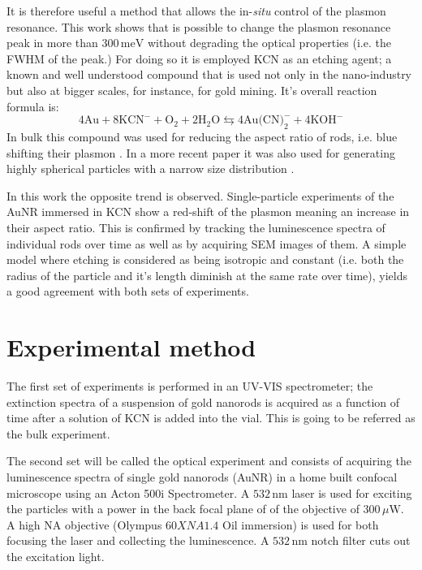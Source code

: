 \documentclass[twocolumn]{article}
\begin{document}
It is therefore useful a method that allows the in-\textit{situ} control of the
plasmon resonance. This work shows that is possible to change the plasmon
resonance peak in more than $300\,\textrm{meV}$ without degrading the optical
properties (i.e. the FWHM of the peak.) For doing so it is employed KCN as an
etching agent; a known and well understood compound that is used not only in the
nano-industry but also at bigger scales, for instance, for gold mining. It's
overall reaction formula is:
\begin{equation*}
4\textrm{Au} + 8\textrm{KCN}^-+\textrm{O}_2 + 2\textrm{H}_2\textrm{O}
\leftrightarrows 4\textrm{Au(CN)}_2^-+4\textrm{KOH}^-
\end{equation*}
In bulk this compound was used for reducing the aspect ratio of rods, i.e.
blue shifting their plasmon \cite{Jana2002}. In a more recent paper it was also
used for generating highly spherical particles with a narrow size
distribution \cite{Lee2013}.

In this work the opposite trend is observed. Single-particle experiments of the
AuNR immersed in KCN show a red-shift of the plasmon meaning an increase in
their aspect ratio. This is confirmed by tracking the luminescence spectra of
individual rods over time as well as by acquiring SEM images of them. A simple
model where etching is considered as being isotropic and constant (i.e. both the
radius of the particle and it's length diminish at the same rate over time),
yields a good agreement with both sets of experiments.

\section{Experimental method}
The first set of experiments is performed in an UV-VIS spectrometer; the
extinction spectra of a suspension of gold nanorods is acquired as a function of
time after a solution of KCN is added into the vial. This is going to be
referred as the bulk experiment.

The second set will be called the optical experiment and consists of acquiring
the luminescence spectra of single gold nanorods (AuNR) in a home built confocal
microscope using an Acton 500i Spectrometer. A $532\,\textrm{nm}$ laser is used
for exciting the particles with a power in the back focal plane of of the
objective of $300\,\mu\textrm{W}$. A high NA objective (Olympus $60X NA 1.4$ Oil
immersion) is used for both focusing the laser and collecting the luminescence.
A $532\,\textrm{nm}$ notch filter cuts out the excitation light.
\end{document}

